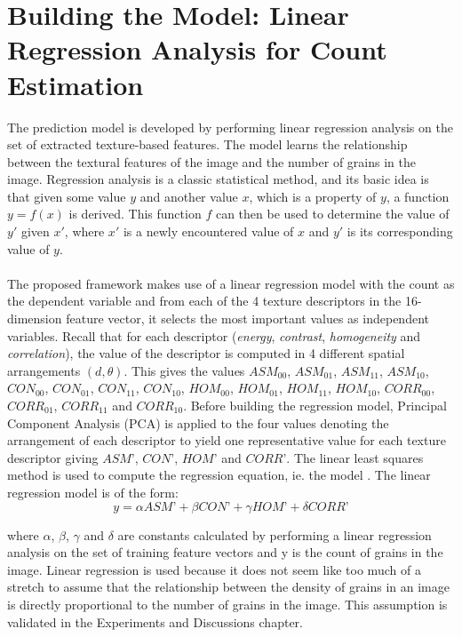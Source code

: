 \bigskip

\goodbreak
\section{Building the Model: Linear Regression Analysis for Count Estimation}
The prediction model is developed by performing linear regression analysis on the set of extracted texture-based features. The model learns the relationship between the textural features of the image and the number of grains in the image. Regression analysis is a classic statistical method, and its basic idea is that given some value $y$ and another value $x$, which is a property of $y$, a function $y = f(x)$ is derived. This function $f$ can then be used to determine the value of $y\prime$ given $x\prime$, where $x\prime$ is a newly encountered value of $x$ and $y\prime$ is its corresponding value of $y$.\\ \\
The proposed framework makes use of a linear regression model with the count as the dependent variable and from each of the 4 texture descriptors in the 16-dimension feature vector, it selects the most important values as independent variables. Recall that for each descriptor (\textit{energy}, \textit{contrast}, \textit{homogeneity} and \textit{correlation}), the value of the descriptor is computed in 4 different spatial arrangements $(d,\theta)$. This gives the values $ASM_{00}$, $ASM_{01}$, $ASM_{11}$, $ASM_{10}$, $CON_{00}$, $CON_{01}$, $CON_{11}$, $CON_{10}$, $HOM_{00}$, $HOM_{01}$, $HOM_{11}$, $HOM_{10}$, $CORR_{00}$, $CORR_{01}$, $CORR_{11}$ and $CORR_{10}$. Before building the regression model, Principal Component Analysis (PCA) is applied to the four values denoting the arrangement of each descriptor to yield one representative value for each texture descriptor giving $ASM\text{'}$, $CON\text{'}$, $HOM\text{'}$ and $CORR\text{'}$. The linear least squares method is used to compute the regression equation, ie. the model \cite{REF27}. The linear regression model is of the form:
\begin{equation}
y = \alpha ASM\text{'} + \beta CON\text{'} + \gamma HOM\text{'} +\delta CORR\text{'}
\end{equation}

where $\alpha$, $\beta$, $\gamma$ and $\delta$ are constants calculated by performing a linear regression analysis on the set of training feature vectors and y is the count of grains in the image. Linear regression is used because it does not seem like too much of a stretch to assume that the relationship between the density of grains in an image is directly proportional to the number of grains in the image. This assumption is validated in the Experiments and Discussions chapter.
\bigskip

